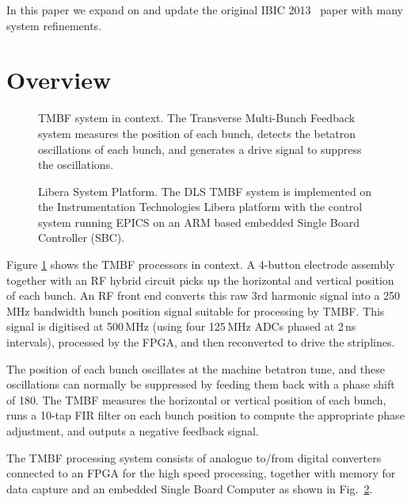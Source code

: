 \documentclass{jacow}
\newcommand{\squarecaption}[2][1]{\caption[#1]{#2\unskip\parfillskip 0pt}}
\begin{document}
In this paper we expand on and update the original IBIC 2013~\cite{ibic2013}
paper with many system refinements.



\section{Overview}

\begin{figure}[ht]
\begin{centering}

\end{centering}
\squarecaption{
TMBF system in context.  The Transverse Multi-Bunch Feedback system measures the
position of each bunch, detects the betatron oscillations of each bunch, and
generates a drive signal to suppress the oscillations.
}
\label{context}
\end{figure}


\begin{figure}[ht]
\begin{centering}

\end{centering}
\squarecaption{
Libera System Platform.  The DLS TMBF system is implemented on the
Instrumentation Technologies Libera platform with the control system running
EPICS on an ARM based embedded Single Board Controller (SBC).
}
\label{system}
\end{figure}


Figure \ref{context} shows the TMBF processors in context.  A 4-button electrode
assembly together with an RF hybrid circuit picks up the horizontal and vertical
position of each bunch.  An RF front end converts this raw 3rd harmonic signal
into a 250\,MHz bandwidth bunch position signal suitable for processing by TMBF.
This signal is digitised at 500\,MHz (using four 125\,MHz ADCs phased at 2\,ns
intervals), processed by the FPGA, and then reconverted to drive the striplines.

The position of each bunch oscillates at the machine betatron tune, and these
oscillations can normally be suppressed by feeding them back with a phase shift
of 180\textdegree.  The TMBF measures the horizontal or vertical position of
each bunch, runs a 10-tap FIR filter on each bunch position to compute the
appropriate phase adjustment, and outputs a negative feedback signal.

The TMBF processing system consists of analogue to/from digital converters
connected to an FPGA for the high speed processing, together with memory for
data capture and an embedded Single Board Computer as shown in
Fig.~\ref{system}.
\end{document}
